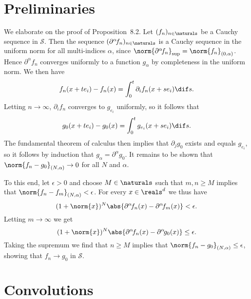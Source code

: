 \documentclass[article, a4paper, 11pt, oneside]{memoir}
\numberwithin{equation}{chapter}
\theoremstyle{nonumberplain}
\begin{document}
\section{Preliminaries}

\newcommand{\calS}{\mathcal{S}}
\newcommand{\schwartz}{\calS}

\begin{remarkbreak}
	We elaborate on the proof of Proposition~8.2. Let $(f_n)_{n\in\naturals}$ be a Cauchy sequence in $\schwartz$. Then the sequence $(\partial^\alpha \!f_n)_{n\in\naturals}$ is a Cauchy sequence in the uniform norm for all multi-indices $\alpha$, since $\norm{\partial^\alpha \!f_n}_{\sup} = \norm{f_n}_{(0,\alpha)}$. Hence $\partial^\alpha \!f_n$ converges uniformly to a function $g_\alpha$ by completeness in the uniform norm. We then have
	\begin{equation*}
		f_n(x + te_i) - f_n(x)
			= \int_0^t \partial_i f_n(x + se_i) \dif s.
	\end{equation*}
	Letting $n \to \infty$, $\partial_i f_n$ converges to $g_{e_i}$ uniformly, so it follows that
	\begin{equation*}
		g_0(x + te_i) - g_0(x)
			= \int_0^t g_{e_i}(x + se_i) \dif s.
	\end{equation*}
	The fundamental theorem of calculus then implies that $\partial_j g_0$ exists and equals $g_{e_i}$, so it follows by induction that $g_\alpha = \partial^\alpha \!g_0$. It remains to be shown that $\norm{f_n - g_0}_{(N,\alpha)} \to 0$ for all $N$ and $\alpha$.

	To this end, let $\epsilon > 0$ and choose $M \in \naturals$ such that $m,n \geq M$ implies that $\norm{f_n - f_m}_{(N,\alpha)} < \epsilon$. For every $x \in \reals^d$ we thus have
	\begin{equation*}
		(1 + \norm{x})^N \abs{\partial^\alpha \!f_n(x) - \partial^\alpha \!f_m(x)}
			< \epsilon.
	\end{equation*}
	Letting $m \to \infty$ we get
	\begin{equation*}
		(1 + \norm{x})^N \abs{\partial^\alpha \!f_n(x) - \partial^\alpha \!g_0(x)}
			\leq \epsilon.
	\end{equation*}
	Taking the supremum we find that $n \geq M$ implies that $\norm{f_n - g_0}_{(N,\alpha)} \leq \epsilon$, showing that $f_n \to g_0$ in $\schwartz$.
\end{remarkbreak}


\section{Convolutions}
\end{document}
